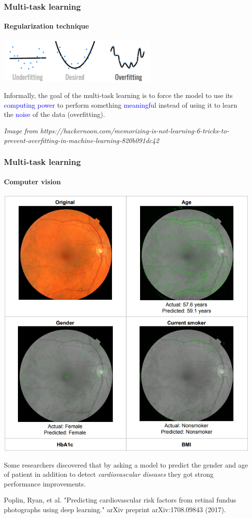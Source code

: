 \documentclass[10pt]{beamer}
\begin{document}
\begin{frame}
  \frametitle{Multi-task learning}

  \framesubtitle{Regularization technique}

  \begin{center}
    \includegraphics[width = 8cm]{images/overfitting.png}
  \end{center}

  Informally, the goal of the multi-task learning is to force the
  model to use its \textcolor{blue}{computing power} to perform
  something \textcolor{blue}{meaningful} instead of using it to learn
  the \textcolor{blue}{noise} of the data (overfitting).

  \bigskip

  {\scriptsize \textit{Image from
      https://hackernoon.com/memorizing-is-not-learning-6-tricks-to-prevent-overfitting-in-machine-learning-820b091dc42}}
\end{frame}

\begin{frame}
  \frametitle{Multi-task learning}

  \framesubtitle{Computer vision}

  \begin{center}
    \includegraphics[width = 5.cm]{images/multi_task_medecine.png}
  \end{center}

  \medskip

  Some researchers discovered that by asking a model to predict the
  gender and age of patient in addition to detect \emph{cardiovascular
    diseases} they got strong performance improvements.

  \medskip

  {\scriptsize Poplin, Ryan, et al. "Predicting cardiovascular risk
    factors from retinal fundus photographs using deep learning."
    arXiv preprint arXiv:1708.09843 (2017).}
\end{frame}
\end{document}
